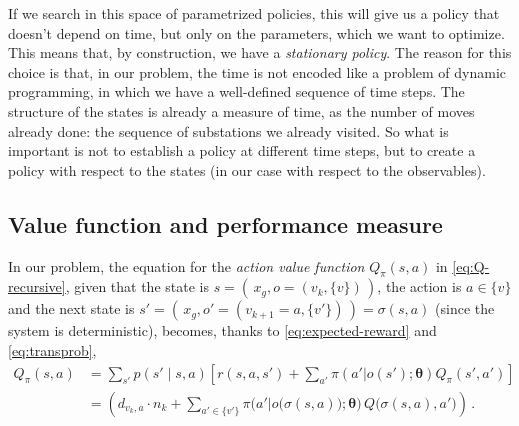 If we search in this space of parametrized policies, this will give us a policy that doesn't depend on time, but only on the parameters, which we want to optimize. This means that, by construction, we have a \emph{stationary policy}. The reason for this choice is that, in our problem, the time is not encoded like a problem of dynamic programming, in which we have a well-defined sequence of time steps. The structure of the states is already a measure of time, as the number of moves already done: the sequence of substations we already visited. So what is important is not to establish a policy at different time steps, but to create a policy with respect to the states (in our case with respect to the observables).


\subsection{Value function and performance measure}

In our problem, the equation for the \emph{action value function} $Q_\pi(s,a)$ in \eqref{eq:Q-recursive}, given that the state is $s = ( \, x_g, o = (v_k, \{v\}) \, )$, the action is $a \in \{v\}$ and the next state is $s' = ( \, x_g, o' = (v_{k+1}=a, \{v'\}) \, ) = \sigma(s,a)$ (since the system is deterministic), becomes, thanks to \eqref{eq:expected-reward} and \eqref{eq:transprob},
\begin{equation}
    \begin{aligned}
        Q_\pi(s,a)
        &= \sum_{s'} p(s' \mid s, a) \left[ r(s,a,s') + \sum_{a'} \pi(a'|o(s'); \boldsymbol \theta)  Q_\pi (s', a') \right] \\
        &= \left(d_{v_k, a} \cdot n_{k} + \sum_{a' \in \{v'\}} \pi \Big( a' \big| o \big( \sigma(s,a) \big); \boldsymbol \theta \Big) \, Q \big( \sigma(s,a), a' \big) \right) \, .
    \end{aligned}
    \label{eq:myQ}
\end{equation}

